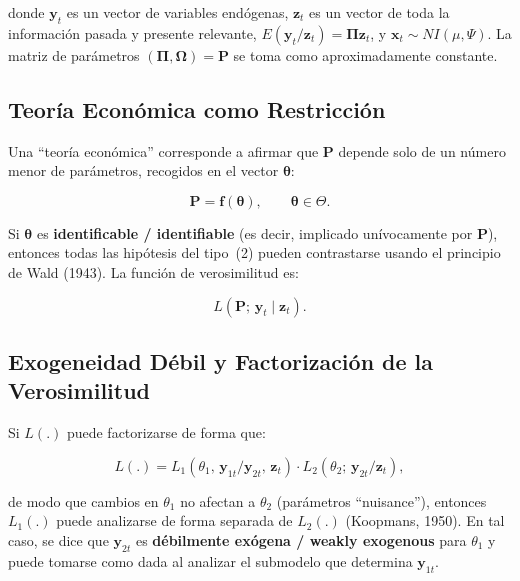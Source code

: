 \documentclass[12pt]{article}
\begin{document}
donde $\mathbf{y}_t$ es un vector de variables end\'ogenas, $\mathbf{z}_t$ es un vector de toda la informaci\'on pasada y presente relevante, $E(\mathbf{y}_t/\mathbf{z}_t) = \mathbf{\Pi z}_t$, y $\mathbf{x}_t \sim NI(\mu, \Psi)$. La matriz de par\'ametros $(\mathbf{\Pi}, \mathbf{\Omega}) = \mathbf{P}$ se toma como aproximadamente constante.

\subsection{Teor\'ia Econ\'omica como Restricci\'on}

Una ``teor\'ia econ\'omica'' corresponde a afirmar que $\mathbf{P}$ depende solo de un n\'umero menor de par\'ametros, recogidos en el vector $\boldsymbol{\theta}$:

\begin{equation}
  \mathbf{P} = \mathbf{f}(\boldsymbol{\theta}), \qquad \boldsymbol{\theta} \in \Theta.
\end{equation}

Si $\boldsymbol{\theta}$ es \textbf{identificable / identifiable} (es decir, implicado un\'ivocamente por $\mathbf{P}$), entonces todas las hip\'otesis del tipo~(2) pueden contrastarse usando el principio de Wald (1943). La funci\'on de verosimilitud es:

\begin{equation}
  L(\mathbf{P};\, \mathbf{y}_t \mid \mathbf{z}_t).
\end{equation}

\subsection{Exogeneidad D\'ebil y Factorizaci\'on de la Verosimilitud}

Si $L(.)$ puede factorizarse de forma que:

\begin{equation}
  L(.) = L_1(\theta_1,\, \mathbf{y}_{1t}/\mathbf{y}_{2t},\, \mathbf{z}_t)\cdot
         L_2(\theta_2;\, \mathbf{y}_{2t}/\mathbf{z}_t),
\end{equation}

de modo que cambios en $\theta_1$ no afectan a $\theta_2$ (par\'ametros ``nuisance''), entonces $L_1(.)$ puede analizarse de forma separada de $L_2(.)$ (Koopmans, 1950). En tal caso, se dice que $\mathbf{y}_{2t}$ es \textbf{d\'ebilmente ex\'ogena / weakly exogenous} para $\theta_1$ y puede tomarse como dada al analizar el submodelo que determina $\mathbf{y}_{1t}$.
\end{document}
